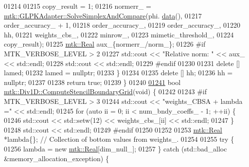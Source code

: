 \begin{DoxyCode}
{{01214 
01215     copy\_result = 1;
01216     normerr\_ = \hyperlink{classmtk_1_1GLPKAdapter_a834480aca83e3c0d09fdab7fdb7e8a3f}{mtk::GLPKAdapter::SolveSimplexAndCompare}(phi.
      \hyperlink{classmtk_1_1DenseMatrix_a0c33b8a9e01d157c61ddbdf807c25d84}{data}(),
01217                                                         order\_accuracy\_ + 1,
01218                                                         order\_accuracy\_,
01219                                                         order\_accuracy\_,
01220                                                         hh,
01221                                                         weights\_cbs\_,
01222                                                         minrow\_,
01223                                                         mimetic\_threshold\_,
01224                                                         copy\_result);
01225     \hyperlink{group__c01-roots_gac080bbbf5cbb5502c9f00405f894857d}{mtk::Real} aux\_\{normerr\_/norm\_\};
01226 \textcolor{preprocessor}{    #if MTK\_VERBOSE\_LEVEL > 2}
01227     std::cout << \textcolor{stringliteral}{"Relative norm: "} << aux\_ << std::endl;
01228     std::cout << std::endl;
01229 \textcolor{preprocessor}{    #endif}
01230 
01231     \textcolor{keyword}{delete} [] lamed;
01232     lamed = \textcolor{keyword}{nullptr};
01233   \}
01234 
01235   \textcolor{keyword}{delete} [] hh;
01236   hh = \textcolor{keyword}{nullptr};
01237 
01238   \textcolor{keywordflow}{return} \textcolor{keyword}{true};
01239 \}
01240 
\hypertarget{mtk__div__1d_8cc_source_l01241}{}\hyperlink{classmtk_1_1Div1D_a29bb417c76286414dce9258a0bcb5aab}{01241} \textcolor{keywordtype}{bool} \hyperlink{classmtk_1_1Div1D_a29bb417c76286414dce9258a0bcb5aab}{mtk::Div1D::ComputeStencilBoundaryGrid}(\textcolor{keywordtype}{void}) \{
01242 
01243 \textcolor{preprocessor}{  #if MTK\_VERBOSE\_LEVEL > 3}
01244   std::cout << \textcolor{stringliteral}{"weights\_CBSA + lambda ="} << std::endl;
01245   \textcolor{keywordflow}{for} (\textcolor{keyword}{auto} ii = 0; ii < num\_bndy\_coeffs\_ - 1; ++ii) \{
01246     std::cout << std::setw(12) << weights\_cbs\_[ii] << std::endl;
01247   \}
01248   std::cout << std::endl;
01249 \textcolor{preprocessor}{  #endif}
01250 
01252 
01253   \hyperlink{group__c01-roots_gac080bbbf5cbb5502c9f00405f894857d}{mtk::Real} *lambda\{\}; \textcolor{comment}{// Collection of bottom values from weights\_.}
01254 
01255   \textcolor{keywordflow}{try} \{
01256     lambda = \textcolor{keyword}{new} \hyperlink{group__c01-roots_gac080bbbf5cbb5502c9f00405f894857d}{mtk::Real}[dim\_null\_];
01257   \} \textcolor{keywordflow}{catch} (std::bad\_alloc &memory\_allocation\_exception) \{
}}
\end{DoxyCode}
